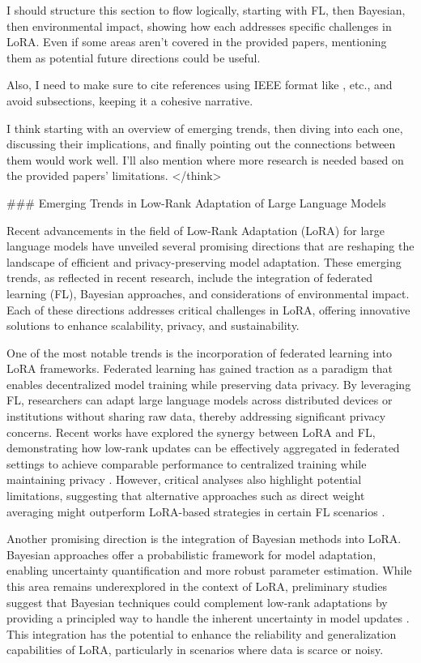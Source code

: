 \documentclass[conference]{IEEEtran}
\begin{document}
I should structure this section to flow logically, starting with FL, then Bayesian, then environmental impact, showing how each addresses specific challenges in LoRA. Even if some areas aren't covered in the provided papers, mentioning them as potential future directions could be useful.

Also, I need to make sure to cite references using IEEE format like \cite{b1}, etc., and avoid subsections, keeping it a cohesive narrative.

I think starting with an overview of emerging trends, then diving into each one, discussing their implications, and finally pointing out the connections between them would work well. I'll also mention where more research is needed based on the provided papers' limitations.
</think>

### Emerging Trends in Low-Rank Adaptation of Large Language Models

Recent advancements in the field of Low-Rank Adaptation (LoRA) for large language models have unveiled several promising directions that are reshaping the landscape of efficient and privacy-preserving model adaptation. These emerging trends, as reflected in recent research, include the integration of federated learning (FL), Bayesian approaches, and considerations of environmental impact. Each of these directions addresses critical challenges in LoRA, offering innovative solutions to enhance scalability, privacy, and sustainability.

One of the most notable trends is the incorporation of federated learning into LoRA frameworks. Federated learning has gained traction as a paradigm that enables decentralized model training while preserving data privacy. By leveraging FL, researchers can adapt large language models across distributed devices or institutions without sharing raw data, thereby addressing significant privacy concerns. Recent works have explored the synergy between LoRA and FL, demonstrating how low-rank updates can be effectively aggregated in federated settings to achieve comparable performance to centralized training while maintaining privacy \cite{b1}. However, critical analyses also highlight potential limitations, suggesting that alternative approaches such as direct weight averaging might outperform LoRA-based strategies in certain FL scenarios \cite{b3}.

Another promising direction is the integration of Bayesian methods into LoRA. Bayesian approaches offer a probabilistic framework for model adaptation, enabling uncertainty quantification and more robust parameter estimation. While this area remains underexplored in the context of LoRA, preliminary studies suggest that Bayesian techniques could complement low-rank adaptations by providing a principled way to handle the inherent uncertainty in model updates \cite{b4}. This integration has the potential to enhance the reliability and generalization capabilities of LoRA, particularly in scenarios where data is scarce or noisy.
\end{document}
